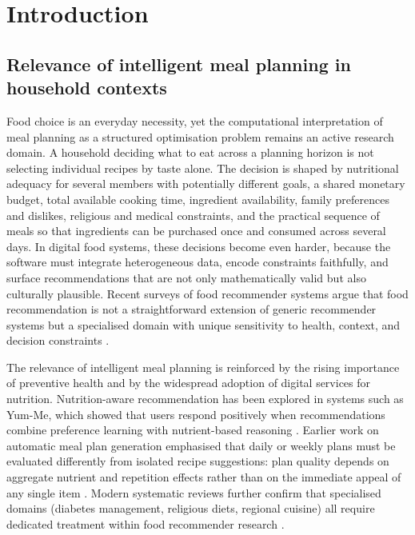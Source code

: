 %
%
\chapter{Introduction}
\label{chap:intro}
\setlength{\parskip}{1em}

\section{Relevance of intelligent meal planning in household contexts}

Food choice is an everyday necessity, yet the computational interpretation of meal planning as a structured optimisation problem remains an active research domain. A household deciding what to eat across a planning horizon is not selecting individual recipes by taste alone. The decision is shaped by nutritional adequacy for several members with potentially different goals, a shared monetary budget, total available cooking time, ingredient availability, family preferences and dislikes, religious and medical constraints, and the practical sequence of meals so that ingredients can be purchased once and consumed across several days. In digital food systems, these decisions become even harder, because the software must integrate heterogeneous data, encode constraints faithfully, and surface recommendations that are not only mathematically valid but also culturally plausible. Recent surveys of food recommender systems argue that food recommendation is not a straightforward extension of generic recommender systems but a specialised domain with unique sensitivity to health, context, and decision constraints \cite{bondevik2024,mahajan2024}.

The relevance of intelligent meal planning is reinforced by the rising importance of preventive health and by the widespread adoption of digital services for nutrition. Nutrition-aware recommendation has been explored in systems such as Yum-Me, which showed that users respond positively when recommendations combine preference learning with nutrient-based reasoning \cite{yang2018}. Earlier work on automatic meal plan generation emphasised that daily or weekly plans must be evaluated differently from isolated recipe suggestions: plan quality depends on aggregate nutrient and repetition effects rather than on the immediate appeal of any single item \cite{elsweiler2015}. Modern systematic reviews further confirm that specialised domains (diabetes management, religious diets, regional cuisine) all require dedicated treatment within food recommender research \cite{yera2023,mahajan2024}.

